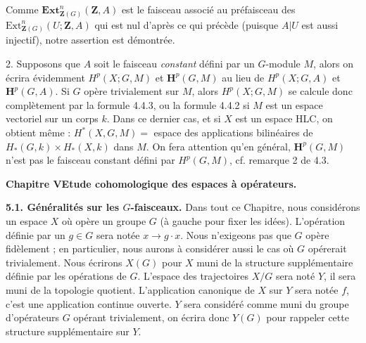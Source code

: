 \clearpage
{}

Comme $\mathbf{Ext}_{\mathbf Z(G)}^n(\mathbf Z,A)$ est le faisceau associé au
préfaisceau des $\mathrm{Ext}_{\mathbf Z(G)}^n(U;\mathbf Z,A)$ qui est nul
d'après ce qui précède (puisque $A|U$ est aussi injectif), notre assertion est
démontrée.

2. Supposons que $A$ soit le faisceau \textit{constant} défini par un
$G$-module $M$, alors on écrira évidemment $H^p(X;G,M)$ et
$\mathbf H^p(G,M)$ au lieu de $H^p(X;G,A)$ et $\mathbf H^p(G,A)$. Si $G$
opère trivialement sur $M$, alors $H^p(X;G,M)$ se calcule donc complètement
par la formule 4.4.3, ou la formule 4.4.2 si $M$ est un espace vectoriel sur
un corps $k$. Dans ce dernier cas, et si $X$ est un espace HLC, on obtient
même :
$H^*(X,G,M)=$ espace des applications bilinéaires de
$H_*(G,k)\times H_*(X,k)$ dans $M$.
On fera attention qu'en général, $\mathbf H^p(G,M)$ n'est pas le faisceau
constant défini par $H^p(G,M)$, cf. remarque 2 de 4.3.

\bigskip
\begin{center}
{\large\bfseries Chapitre V\quad Etude cohomologique des espaces à
opérateurs.}
\end{center}

\textbf{5.1. Généralités sur les $G$-faisceaux.}
Dans tout ce Chapitre, nous considérons un espace $X$ où opère un groupe $G$
(à gauche pour fixer les idées). L'opération définie par un $g\in G$ sera
notée $x\to g\mathbin{\cdot}x$. Nous n'exigeons pas que $G$ opère
fidèlement ; en particulier, nous aurons à considérer aussi le cas où $G$
opérerait trivialement. Nous écrirons $X(G)$ pour $X$ muni de la structure
supplémentaire définie par les opérations de $G$. L'espace des trajectoires
$X/G$ sera noté $Y$, il sera muni de la topologie quotient. L'application
canonique de $X$ sur $Y$ sera notée $f$, c'est une application continue
ouverte. $Y$ sera considéré comme muni du groupe d'opérateurs $G$ opérant
trivialement, on écrira donc $Y(G)$ pour rappeler cette structure
supplémentaire sur $Y$.

